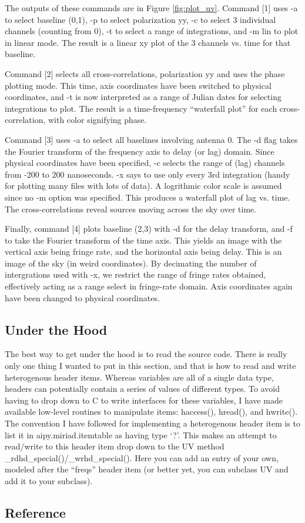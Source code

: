 The outputs of these commands are in Figure \ref{fig:plot_uv}.  Command [1]
uses -a to select baseline (0,1), -p to select polarization yy, -c to
select 3 individual channels (counting from 0), -t to select a range of
integrations, and -m lin to plot in linear mode.  The result
is a linear xy plot of the 3 channels vs. time for that baseline.

Command [2] selects all cross-correlations, polarization yy and uses
the phase plotting mode.  This time, axis coordinates have been switched
to physical coordinates, and -t is now interpreted as a range of Julian dates
for selecting integrations to plot.  The result is a time-frequency 
``waterfall plot'' for each cross-correlation, with color signifying phase.

Command [3] uses -a to select all baselines involving antenna 0.  The
-d flag takes the Fourier transform of the frequency axis to delay (or lag)
domain.  Since physical coordinates have been specified, -c selects the 
range of (lag) channels from -200 to 200 nanoseconds.  -x says to use
only every 3rd integration (handy for plotting many files with lots of data).
A logrithmic color scale is assumed since no -m option was specified. 
This produces a waterfall plot of lag vs. time.  The
cross-correlations reveal sources moving across the sky over time.

Finally, command [4] plots baseline (2,3) with -d for the delay transform,
and -f to take the Fourier transform of the time axis.  This yields an
image with the vertical axis being fringe rate, and the horizontal axis being
delay.  This is an image of the sky (in weird coordinates).  By decimating
the number of intergrations used with -x, we restrict the range of fringe
rates obtained, effectively acting as a range select in fringe-rate domain.
Axis coordinates again have been changed to physical coordinates.

\subsection{Under the Hood}

The best way to get under the hood is to read the source code.  There is really
only one thing I wanted to put in this section, and that is how to read and
write heterogenous header items.  Whereas variables are all of a single data
type, headers can potentially contain a series of values of different types.
To avoid having to drop down to C to write interfaces for these variables, I
have made available low-level routines to manipulate items: haccess(), hread(),
and hwrite().  The convention I have followed for implementing a heterogenous
header item is to list it in aipy.miriad.itemtable as having type `?'.  This
makes an attempt to read/write to this header item drop down to the UV method
\_rdhd\_special()/\_wrhd\_special().  Here you can add an entry of your own,
modeled after the ``freqs'' header item (or better yet, you can subclass
UV and add it to your subclass).

\subsection{Reference}

